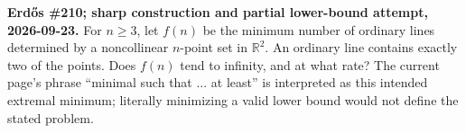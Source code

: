 \textbf{Erd\H{o}s \#210; sharp construction and partial lower-bound attempt, 2026-09-23.}
For $n\geq3$, let $f(n)$ be the minimum number of ordinary lines determined by a noncollinear $n$-point set in $\mathbb R^2$. An ordinary line contains exactly two of the points. Does $f(n)$ tend to infinity, and at what rate? The current page's phrase ``minimal such that ... at least'' is interpreted as this intended extremal minimum; literally minimizing a valid lower bound would not define the stated problem.
